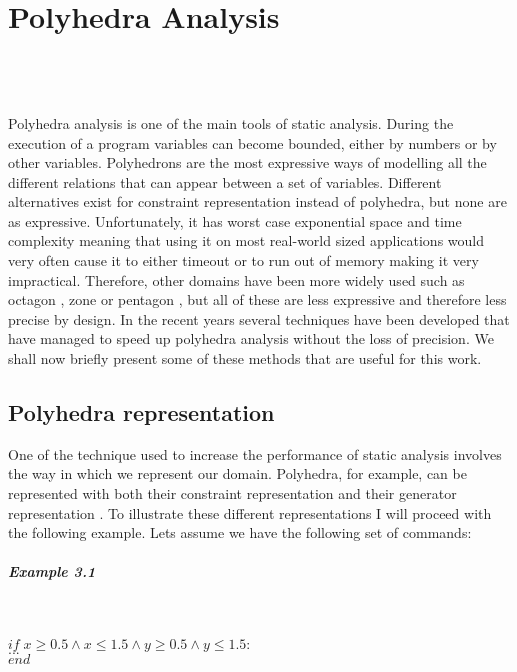 
\chapter{Polyhedra Analysis}
\mbox{}\\
\mbox{}\\
\mbox{}\\
Polyhedra analysis is one of the main tools of static analysis\cite{cousot1977abstract}. During the execution of a program variables can become bounded, either by numbers or by other variables. Polyhedrons are the most expressive ways of modelling all the different relations that can appear between a set of variables. Different alternatives exist for constraint representation instead of polyhedra, but none are as expressive. Unfortunately, it has worst case exponential space and time complexity meaning that using it on most real-world sized applications would very often cause it to either timeout or to run out of memory making it very impractical. Therefore, other domains have been more widely used such as octagon \cite{mine2006octagon}, zone \cite{mine2001new} or pentagon \cite{logozzo2010pentagons} , but all of these are less expressive and therefore less precise by design. In the recent years several techniques have been developed that have managed to speed up polyhedra analysis without the loss of precision\cite{gange2016exploiting,jourdan2017sparsity,marechal2017efficient}. We shall now briefly present some of these methods that are useful for this work.

\section{Polyhedra representation}
One of the technique used to increase the performance of static analysis involves the way in which we represent our domain\cite{singh2015making}. Polyhedra, for example, can be represented with both their constraint representation and their generator representation\cite{motzkin1953double} . To illustrate these different representations I will proceed with the following example. Lets assume we have the following set of commands:
\paragraph{Example 3.1}\mbox{}\\
\begin{center}
	$if \; x\geq0.5\wedge x\leq 1.5 \wedge y\geq 0.5 \wedge y \leq1.5: $\\
	$...\;\;\;\;\;$\\
	$end \qquad\qquad\qquad\qquad\qquad\qquad\qquad\qquad$
\end{center}

